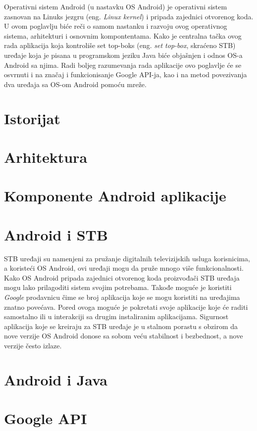 \documentclass[../TamaraIvanovicMasterRad.tex]{subfiles}
\begin{document}
Operativni sistem Android (u nastavku OS Android) je operativni sistem zasnovan na Linuks jezgru (eng. \textit{Linux kernel}) i pripada zajednici otvorenog koda. U ovom poglavlju biće reči o samom nastanku i razvoju ovog operativnog sistema, arhitekturi i osnovnim kompontentama. Kako je centralna tačka ovog rada aplikacija koja kontroliše set top-boks (eng. \textit{set top-box}, skraćeno STB) uređaje koja je pisana u programskom jeziku Java biće objašnjen i odnos OS-a Android sa njima. Radi boljeg razumevanja rada aplikacije ovo poglavlje će se osvrnuti i na značaj i funkcionisanje Google API-ja, kao i na metod povezivanja dva uređaja sa OS-om Android pomoću mreže. 
\section{Istorijat}



\section{Arhitektura}



\section{Komponente Android aplikacije}


\section{Android i STB}
STB uređaji su namenjeni za pružanje digitalnih televizijskih usluga korisnicima, a koristeći OS Android, ovi uređaji mogu da pruže mnogo više funkcionalnosti. Kako OS Android pripada zajednici otvorenog koda proizvođači STB uređaja mogu lako prilagoditi sistem svojim potrebama. Takođe moguće je koristiti \textit{Google} prodavnicu čime se broj aplikacija koje se mogu koristiti na uređajima znatno povećava. Pored ovoga moguće je pokretati svoje aplikacije koje će raditi samostalno ili u interakciji sa drugim instaliranim aplikacijama. Sigurnost aplikacija koje se kreiraju za STB uređaje je u stalnom porastu s obzirom da nove verzije OS Android donose sa sobom veću stabilnost i bezbednost, a nove verzije često izlaze. 

\section{Android i Java}
\section{Google API}\label{sec:google}

\end{document}
